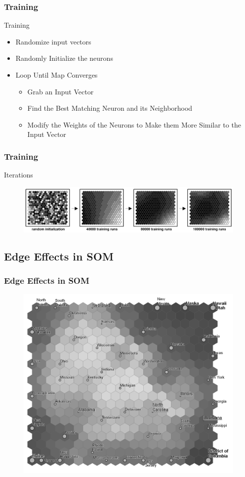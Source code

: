 \documentclass[nototal,handout]{beamer}
\begin{document}
\begin{frame}
	\frametitle{Training}
 
\begin{block}{Training}
 \begin{itemize}
 \item  Randomize input vectors
 \item  Randomly Initialize the neurons
 \item  Loop Until Map Converges
 \begin{itemize}
 \item  Grab an Input Vector
 \item  Find the Best Matching Neuron and its Neighborhood
 \item  Modify the Weights of the Neurons to Make them More Similar to the Input Vector
 \end{itemize}
 \end{itemize}
 \end{block} \end{frame} 

\begin{frame}
	\frametitle{Training}
 
\begin{block}{Iterations}
  \begin{center}
  \begin{figure}
  \includegraphics[width=0.90\linewidth]{somtrain.png}
  \end{figure}
  \end{center}
 \end{block} \end{frame} 

\subsection{Edge Effects in SOM} 

\begin{frame}
	\frametitle{Edge Effects in SOM}
  \begin{center}
  \begin{figure}
  \includegraphics[width=0.60\linewidth]{gridedge.png}
  \end{figure}
  \end{center}
 \end{frame} 
\end{document}
